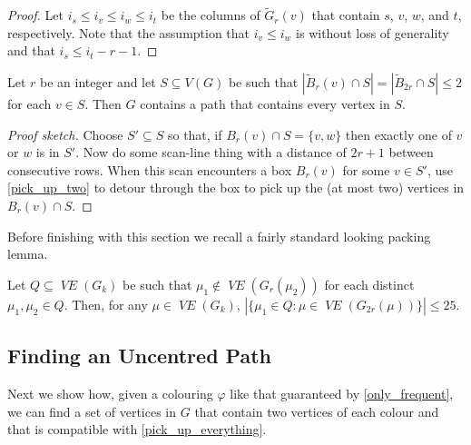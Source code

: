 \documentclass{patmorin}
\DeclareMathOperator{\VE}{\mathit{VE}}
\begin{document}
\begin{proof}
  Let $i_s \le i_v \le i_w \le i_t$ be the columns of $\tilde{G}_r(v)$ that contain $s$, $v$, $w$, and $t$, respectively.  Note that the assumption that $i_v \le i_w$ is without loss of generality and that $i_s \le i_t - r -1$.
\end{proof}

\begin{lem}\label{pick_up_everything}
  Let $r$ be an integer and let $S\subseteq V(G)$ be such that $|\tilde{B}_{r}(v)\cap S|=|\tilde{B}_{2r}\cap S|\le 2$ for each $v\in S$.  Then $G$ contains a path that contains every vertex in $S$. 
\end{lem}

\begin{proof}[Proof sketch]
  Choose $S'\subseteq S$ so that, if $B_r(v)\cap S=\{v,w\}$ then exactly one of $v$ or $w$ is in $S'$. Now do some scan-line thing with a distance of $2r+1$ between consecutive rows.  When this scan encounters a box $B_r(v)$ for some $v\in S'$, use \cref{pick_up_two} to detour through the box to pick up the (at most two) vertices in $B_r(v)\cap S$.
\end{proof}


Before finishing with this section we recall a fairly standard looking packing lemma.


\begin{lem}\label{packing_lemma}
  Let $Q\subseteq \VE(G_k)$ be such that $\mu_1\not\in \VE(G_r(\mu_2))$ for each distinct $\mu_1,\mu_2\in Q$.  Then, for any $\mu\in \VE(G_k)$, 
  $|\{\mu_1\in Q: \mu\in \VE(G_{2r}(\mu))\}| \le 25$.
\end{lem}


\subsection{Finding an Uncentred Path}

Next we show how, given a colouring $\varphi$ like that guaranteed by \cref{only_frequent}, we can find a set of vertices in $G$ that contain two vertices of each colour and that is compatible with \cref{pick_up_everything}.
\end{document}
